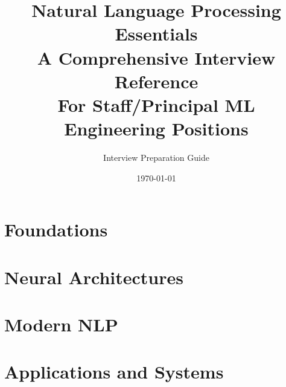 \documentclass[11pt,twoside]{book}
\title{
    \Huge\textbf{Natural Language Processing Essentials}\\[0.5cm]
    \Large A Comprehensive Interview Reference\\[0.3cm]
    \large For Staff/Principal ML Engineering Positions
}
\author{Interview Preparation Guide}
\date{\today}
\begin{document}
\frontmatter
\maketitle
\tableofcontents




\mainmatter

\part{Foundations}





\part{Neural Architectures}




\part{Modern NLP}





\part{Applications and Systems}





\end{document}

